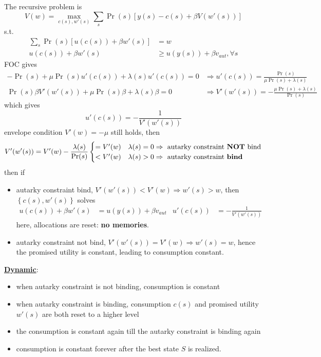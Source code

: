 \documentclass[10pt,landscape,a4paper]{article}
\begin{document}
\begin{multicols*}{3}
The recursive problem is 
$$
V(w) = \max_{c(s),w'(s)}\sum_s \Pr(s) \left[ y(s)-c(s) + \beta V(w'(s)) \right]
$$
s.t.
\begin{align*}
    \sum_s \Pr(s)\left[ u(c(s))+\beta w'(s) \right] &= w \\
    u(c(s)) + \beta w'(s) &\geq u(y(s))+\beta v_{aut}, \forall s
\end{align*}
FOC gives
\begin{align*}
    -\Pr(s) + \mu\Pr(s)u'(c(s)) + \lambda(s)u'(c(s)) = 0 & \Rightarrow u'(c(s)) = \frac{\Pr(s)}{\mu\Pr(s)+\lambda(s)} \\
    \Pr(s)\beta V'(w'(s)) + \mu\Pr(s)\beta +\lambda(s)\beta = 0  &\Rightarrow V'(w'(s)) = -\frac{\mu \Pr(s)+\lambda(s)}{\Pr(s)}
\end{align*}
which gives
{\color{myred}$$
u'(c(s)) = -\frac{1}{V'(w'(s))}
$$}
envelope condition $V'(w)=-\mu$ still holds, then 
$$
V'(w'(s)) = V'(w) -\frac{\lambda(s)}{\Pr(s)} \begin{cases}
= V'(w) & \lambda(s)=0 \Rightarrow \text{ autarky constraint \textbf{NOT} bind}\\
< V'(w) & \lambda(s)>0 \Rightarrow \text{ autarky constraint \textbf{bind}}
\end{cases} 
$$
then if
\begin{itemize}
    \item[-] autarky constraint bind, $V'(w'(s))<V'(w)\Rightarrow w'(s)>w$, then $\left\{c(s),w'(s)\right\}$ solves 
    \begin{align*}
        u(c(s)) + \beta w'(s) &= u(y(s)) + \beta v_{aut} & u'(c(s)) &= -\frac{1}{V'(w'(s))}
    \end{align*}
    here, allocations are reset: \textbf{no memories}.
    \item[-] autarky constraint not bind, $V'(w'(s))=V'(w)\Rightarrow w'(s) = w$, hence the promised utility is constant, leading to consumption constant.
\end{itemize}
\underline{\textbf{\color{myred}Dynamic}}:
\begin{itemize}
    \item[1] when autarky constraint is not binding, consumption is constant
    \item[2] when autarky constraint is binding, consumption $c(s)$ and promised utility $w'(s)$ are both reset to a higher level
    \item[3] the consumption is constant again till the autarky constraint is binding again
    \item[4] consumption is constant forever after the best state $S$ is realized.
\end{itemize}


\end{multicols*}
\end{document}
